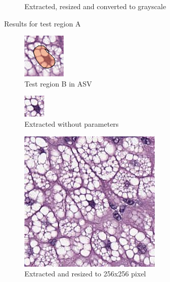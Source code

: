 \begin{figure}[H]
\begin{subfigure}{.5\textwidth}
		\caption{Extracted, resized and converted to grayscale}
		\label{subfig5:a5}
	\end{subfigure}
	\caption{Results for test region A}
	\label{fig5_result1}
\end{figure}

\begin{figure}[H]
	\begin{subfigure}{.5\textwidth}
		\centering
		\includegraphics{img/ts_test/region3.png}
		\caption{Test region B in ASV}
	\end{subfigure}
	\begin{subfigure}{.5\textwidth}
		\centering
		\includegraphics{img/ts_test/3_orig.jpeg}
		\caption{Extracted without parameters}
		\label{subfig5:b1}
	\end{subfigure}
	\begin{subfigure}{.5\textwidth}
		\centering
		\includegraphics[width=.8\linewidth]{img/ts_test/3_r256.jpeg}
		\caption{Extracted and resized to 256x256 pixel}
		\label{subfig5:b2}
	\end{subfigure}
	\begin{subfigure}{.5\textwidth}
		\centering

\end{subfigure}
\end{figure}
